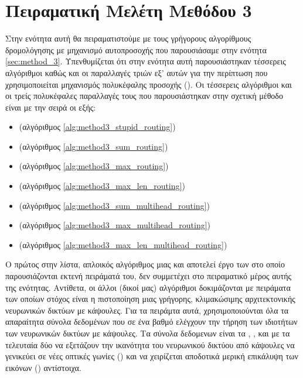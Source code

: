 \section{Πειραματική Μελέτη Μεθόδου 3}
\label{sec:method_3_experiments}
Στην ενότητα αυτή θα πειραματιστούμε με τους γρήγορους αλγορίθμους δρομολόγησης με μηχανισμό αυτοπροσοχής που παρουσιάσαμε στην ενότητα \ref{sec:method_3}. Υπενθυμίζεται ότι στην ενότητα αυτή παρουσιάστηκαν τέσσερεις αλγόριθμοι καθώς και οι παραλλαγές τριών εξ' αυτών για την περίπτωση που χρησιμοποιείται μηχανισμός πολυκέφαλης προσοχής (). Οι τέσσερεις αλγόριθμοι και οι τρείς πολυκέφαλες παραλλαγές τους που παρουσιάστηκαν στην σχετική μέθοδο είναι με την σειρά οι εξής: 
\begin{itemize}
    \item {} (αλγόριθμος \ref{alg:method3_stupid_routing})
    \item {} (αλγόριθμος \ref{alg:method3_sum_routing})
    \item {} (αλγόριθμος \ref{alg:method3_max_routing})
    \item {} (αλγόριθμος \ref{alg:method3_max_len_routing})
    \item {} (αλγόριθμος \ref{alg:method3_sum_multihead_routing})
    \item {} (αλγόριθμος \ref{alg:method3_max_multihead_routing})
    \item {} (αλγόριθμος \ref{alg:method3_max_len_multihead_routing})
\end{itemize}

Ο πρώτος στην λίστα, απλοικός αλγόριθμος μιας και αποτελεί έργο των \cite{mazzia2021efficient} στο οποίο παρουσιάζονται εκτενή πειράματά του, δεν συμμετέχει στο πειραματικό μέρος αυτής της ενότητας. Αντίθετα, οι άλλοι (δικοί μας) αλγόριθμοι δοκιμάζονται με πειράματα των οποίων στόχος είναι η πιστοποίηση μιας γρήγορης, κλιμακώσιμης αρχιτεκτονικής νευρωνικών δικτύων με κάψουλες. Για τα πειράμτα αυτά, χρησιμοποιούνται όλα τα απαραίτητα σύνολα δεδομένων που σε ένα βαθμό ελέγχουν την τήρηση των ιδιοτήτων των νευρωνικών δικτύων με κάψουλες. Τα σύνολα δεδομενων είναι τα , ,  και  με τα τελευταία δύο να εξετάζουν την ικανότητα του νευρωνικού δικτύου από κάψουλες να γενικεύει σε νέες οπτικές γωνίες () και να χειρίζεται αποδοτικά μερική επικάλυψη των εικόνων () αντίστοιχα.\par

